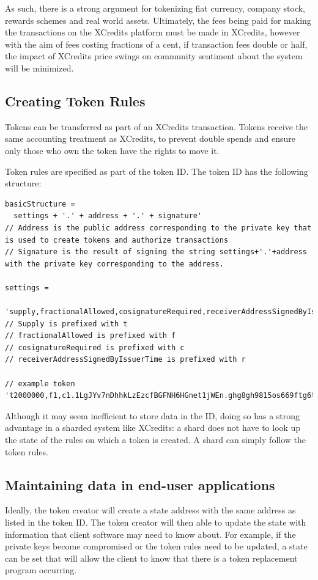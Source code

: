 \documentclass[a4paper,12pt]{article}
\begin{document}
As such, there is a strong argument for tokenizing fiat currency, company stock, rewards schemes and real world assets. Ultimately, the fees being paid for making the transactions on the XCredits platform must be made in XCredits, however with the aim of fees costing fractions of a cent, if transaction fees double or half, the impact of XCredits price swings on community sentiment about the system will be minimized.

\subsection{Creating Token Rules}
Tokens can be transferred as part of an XCredits transaction. Tokens receive the same accounting treatment as XCredits, to prevent double spends and ensure only those who own the token have the rights to move it. 

Token rules are specified as part of the token ID. The token ID has the following structure:
\begin{lstlisting}
basicStructure = 
  settings + '.' + address + '.' + signature'
// Address is the public address corresponding to the private key that is used to create tokens and authorize transactions 
// Signature is the result of signing the string settings+'.'+address with the private key corresponding to the address. 

settings = 
  'supply,fractionalAllowed,cosignatureRequired,receiverAddressSignedByIssuerTime'
// Supply is prefixed with t
// fractionalAllowed is prefixed with f
// cosignatureRequired is prefixed with c
// receiverAddressSignedByIssuerTime is prefixed with r

// example token
't2000000,f1,c1.1LgJYv7nDhhkLzEzcfBGFNH6HGnet1jWEn.ghg8gh9815os669ftg6tsy6f76tr8'
\end{lstlisting}

Although it may seem inefficient to store data in the ID, doing so has a strong advantage in a sharded system like XCredits: a shard does not have to look up the state of the rules on which a token is created. A shard can simply follow the token rules. 

\subsection{Maintaining data in end-user applications}
Ideally, the token creator will create a state address with the same address as listed in the token ID. The token creator will then able to update the state with information that client software may need to know about. For example, if the private keys become compromised or the token rules need to be updated, a state can be set that will allow the client to know that there is a token replacement program occurring. 
\end{document}
